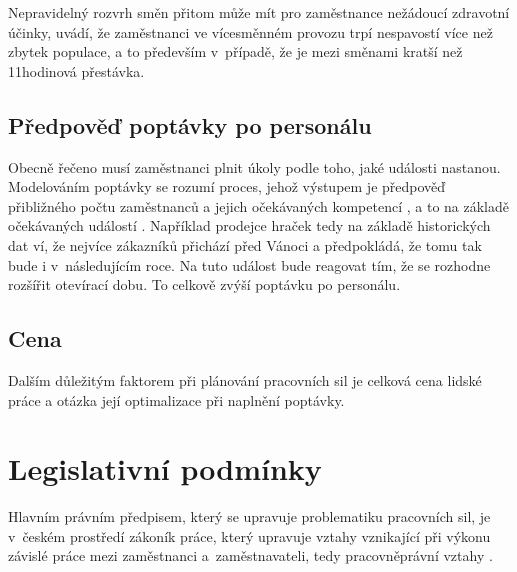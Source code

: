 \documentclass[twoside]{ctuthesis}
\begin{document}
Nepravidelný rozvrh směn přitom může mít pro zaměstnance nežádoucí zdravotní účinky, \cite{flo2013shift} uvádí, že zaměstnanci ve vícesměnném provozu trpí nespavostí více než zbytek populace, a to především v~případě, že je mezi směnami kratší než 11hodinová přestávka.




\subsection{Předpověď poptávky po personálu}
\label{sub:demand}
Obecně řečeno musí zaměstnanci plnit úkoly podle toho, jaké události nastanou. Modelováním poptávky se rozumí proces, jehož výstupem je předpověď přibližného počtu zaměstnanců a jejich očekávaných kompetencí \cite[s.~219]{armstrong2014}, a to na základě očekávaných událostí \cite{ernst2004staff}.
Například prodejce hraček tedy na základě historických dat ví, že nejvíce zákazníků přichází před Vánoci a předpokládá, že tomu tak bude i v~následujícím roce. Na tuto událost bude reagovat tím, že se rozhodne rozšířit otevírací dobu. To celkově zvýší poptávku po personálu.

\subsection{Cena}
Dalším důležitým faktorem při plánování pracovních sil je celková cena lidské práce a otázka její optimalizace při naplnění poptávky.


\section{Legislativní podmínky}
\label{section:legislativa}
Hlavním právním předpisem, který se upravuje problematiku pracovních sil, je v~českém prostředí zákoník práce, který upravuje vztahy vznikající při výkonu závislé práce mezi zaměstnanci a~zaměstnavateli, tedy pracovněprávní vztahy \cite{zakonik06-262}.
\end{document}
